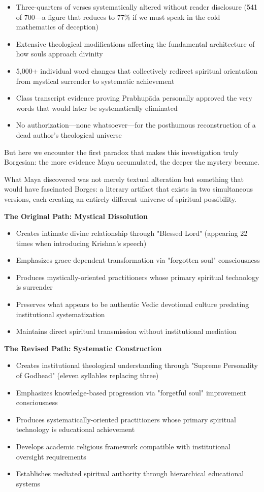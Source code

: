 \documentclass[12pt,twoside]{book}
\begin{document}
\begin{itemize}
\item Three-quarters of verses systematically altered without reader disclosure (541 of 700—a figure that reduces to 77\% if we must speak in the cold mathematics of deception)
\item Extensive theological modifications affecting the fundamental architecture of how souls approach divinity
\item 5,000+ individual word changes that collectively redirect spiritual orientation from mystical surrender to systematic achievement
\item Class transcript evidence proving Prabhupāda personally approved the very words that would later be systematically eliminated
\item No authorization—none whatsoever—for the posthumous reconstruction of a dead author's theological universe
\end{itemize}

But here we encounter the first paradox that makes this investigation truly Borgesian: the more evidence Maya accumulated, the deeper the mystery became.

What Maya discovered was not merely textual alteration but something that would have fascinated Borges: a literary artifact that exists in two simultaneous versions, each creating an entirely different universe of spiritual possibility.

\textbf{\textbf{The Original Path: Mystical Dissolution}}
\begin{itemize}
\item Creates intimate divine relationship through "Blessed Lord" (appearing 22 times when introducing Krishna's speech)
\item Emphasizes grace-dependent transformation via "forgotten soul" consciousness
\item Produces mystically-oriented practitioners whose primary spiritual technology is surrender
\item Preserves what appears to be authentic Vedic devotional culture predating institutional systematization
\item Maintains direct spiritual transmission without institutional mediation
\end{itemize}

\textbf{\textbf{The Revised Path: Systematic Construction}}  
\begin{itemize}
\item Creates institutional theological understanding through "Supreme Personality of Godhead" (eleven syllables replacing three)
\item Emphasizes knowledge-based progression via "forgetful soul" improvement consciousness
\item Produces systematically-oriented practitioners whose primary spiritual technology is educational achievement
\item Develops academic religious framework compatible with institutional oversight requirements
\item Establishes mediated spiritual authority through hierarchical educational systems
\end{itemize}
\end{document}
